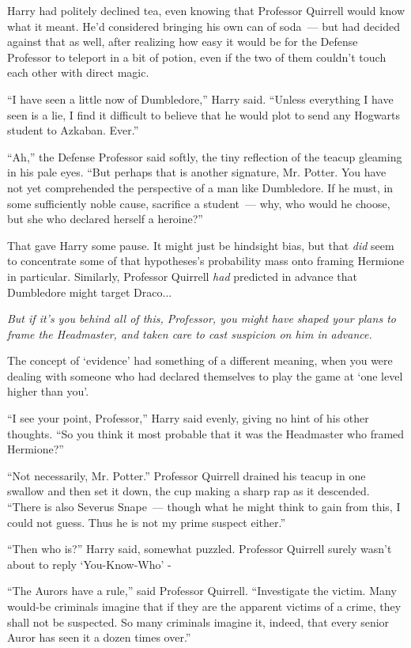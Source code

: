 Harry had politely declined tea, even knowing that Professor Quirrell would know what it meant. He'd considered bringing his own can of soda~--- but had decided against that as well, after realizing how easy it would be for the Defense Professor to teleport in a bit of potion, even if the two of them couldn't touch each other with direct magic.

``I have seen a little now of Dumbledore,'' Harry said. ``Unless everything I have seen is a lie, I find it difficult to believe that he would plot to send any Hogwarts student to Azkaban. Ever.''

``Ah,'' the Defense Professor said softly, the tiny reflection of the teacup gleaming in his pale eyes. ``But perhaps that is another signature, Mr. Potter. You have not yet comprehended the perspective of a man like Dumbledore. If he must, in some sufficiently noble cause, sacrifice a student~--- why, who would he choose, but she who declared herself a heroine?''

That gave Harry some pause. It might just be hindsight bias, but that \emph{did} seem to concentrate some of that hypotheses's probability mass onto framing Hermione in particular. Similarly, Professor Quirrell \emph{had} predicted in advance that Dumbledore might target Draco...

\emph{But if it's you behind all of this, Professor, you might have shaped your plans to frame the Headmaster, and taken care to cast suspicion on him in advance.}

The concept of `evidence' had something of a different meaning, when you were dealing with someone who had declared themselves to play the game at `one level higher than you'.

``I see your point, Professor,'' Harry said evenly, giving no hint of his other thoughts. ``So you think it most probable that it was the Headmaster who framed Hermione?''

``Not necessarily, Mr. Potter.'' Professor Quirrell drained his teacup in one swallow and then set it down, the cup making a sharp rap as it descended. ``There is also Severus Snape~--- though what he might think to gain from this, I could not guess. Thus he is not my prime suspect either.''

``Then who is?'' Harry said, somewhat puzzled. Professor Quirrell surely wasn't about to reply `You-Know-Who' -

``The Aurors have a rule,'' said Professor Quirrell. ``Investigate the victim. Many would-be criminals imagine that if they are the apparent victims of a crime, they shall not be suspected. So many criminals imagine it, indeed, that every senior Auror has seen it a dozen times over.''

